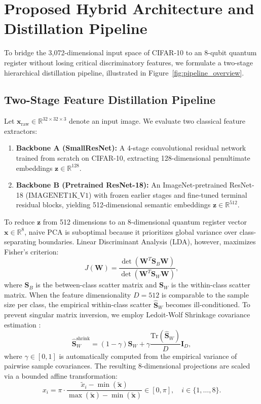\documentclass[10pt,twocolumn,twoside,a4paper]{article}
\begin{document}
\section{Proposed Hybrid Architecture and Distillation Pipeline}
\label{sec:proposed_architecture}

To bridge the 3,072-dimensional input space of CIFAR-10 to an 8-qubit quantum register without losing critical discriminatory features, we formulate a two-stage hierarchical distillation pipeline, illustrated in Figure~\ref{fig:pipeline_overview}.

\subsection{Two-Stage Feature Distillation Pipeline}
Let $\mathbf{x}_{\text{raw}} \in \mathbb{R}^{32 \times 32 \times 3}$ denote an input image. We evaluate two classical feature extractors:
\begin{enumerate}
    \item \textbf{Backbone A (SmallResNet):} A 4-stage convolutional residual network trained from scratch on CIFAR-10, extracting 128-dimensional penultimate embeddings $\mathbf{z} \in \mathbb{R}^{128}$.
    \item \textbf{Backbone B (Pretrained ResNet-18):} An ImageNet-pretrained ResNet-18 ($\text{IMAGENET1K\_V1}$) with frozen earlier stages and fine-tuned terminal residual blocks, yielding 512-dimensional semantic embeddings $\mathbf{z} \in \mathbb{R}^{512}$.
\end{enumerate}

To reduce $\mathbf{z}$ from 512 dimensions to an 8-dimensional quantum register vector $\mathbf{x} \in \mathbb{R}^8$, naive PCA is suboptimal because it prioritizes global variance over class-separating boundaries. Linear Discriminant Analysis (LDA), however, maximizes Fisher's criterion:
\begin{equation}
    J(\mathbf{W}) = \frac{\det(\mathbf{W}^T \mathbf{S}_B \mathbf{W})}{\det(\mathbf{W}^T \mathbf{S}_W \mathbf{W})},
\end{equation}
where $\mathbf{S}_B$ is the between-class scatter matrix and $\mathbf{S}_W$ is the within-class scatter matrix. When the feature dimensionality $D = 512$ is comparable to the sample size per class, the empirical within-class scatter $\hat{\mathbf{S}}_W$ becomes ill-conditioned. To prevent singular matrix inversion, we employ Ledoit-Wolf Shrinkage covariance estimation \cite{ledoit2004well}:
\begin{equation}
    \hat{\mathbf{S}}_W^{\text{shrink}} = (1 - \gamma) \hat{\mathbf{S}}_W + \gamma \frac{\text{Tr}(\hat{\mathbf{S}}_W)}{D} \mathbf{I}_D,
\end{equation}
where $\gamma \in [0, 1]$ is automatically computed from the empirical variance of pairwise sample covariances. The resulting 8-dimensional projections are scaled via a bounded affine transformation:
\begin{equation}
    x_i = \pi \cdot \frac{\tilde{x}_i - \min(\tilde{\mathbf{x}})}{\max(\tilde{\mathbf{x}}) - \min(\tilde{\mathbf{x}})} \in [0, \pi], \quad i \in \{1, \dots, 8\}.
\end{equation}
\end{document}
